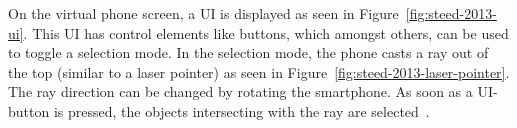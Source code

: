 On the virtual phone screen, a \ac{UI} is displayed as seen in Figure~\ref{fig:steed-2013-ui}. This \ac{UI} has control elements like buttons, which amongst others, can be used to toggle a selection mode. In the selection mode, the phone casts a ray out of the top (similar to a laser pointer) as seen in Figure~\ref{fig:steed-2013-laser-pointer}. The ray direction can be changed by rotating the smartphone. As soon as a \ac{UI}-button is pressed, the objects intersecting with the ray are selected~\cite{Steed.2013}.
